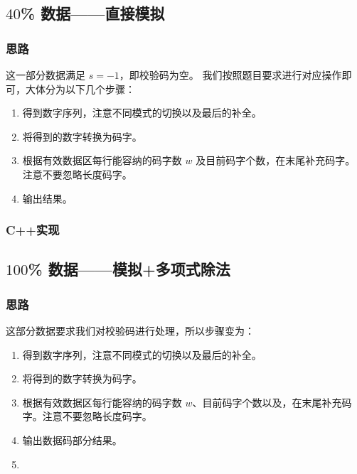 
% 

\subsection{$40$\% 数据——直接模拟}

\subsubsection{思路}

这一部分数据满足 $s=-1$，即校验码为空。
我们按照题目要求进行对应操作即可，大体分为以下几个步骤：

\begin{enumerate}
    \item 得到数字序列，注意不同模式的切换以及最后的补全。
    \item 将得到的数字转换为码字。
    \item 根据有效数据区每行能容纳的码字数 $w$ 及目前码字个数，在末尾补充码字。注意不要忽略长度码字。
    \item 输出结果。
\end{enumerate}

\subsubsection{C++实现}



\subsection{$100$\% 数据——模拟+多项式除法}

\subsubsection{思路}

这部分数据要求我们对校验码进行处理，所以步骤变为：

\begin{enumerate}
    \item 得到数字序列，注意不同模式的切换以及最后的补全。
    \item 将得到的数字转换为码字。
    \item 根据有效数据区每行能容纳的码字数 $w$、目前码字个数以及{}，在末尾补充码字。注意不要忽略长度码字。
    \item 输出数据码部分结果。
    \item {}
\end{enumerate}

